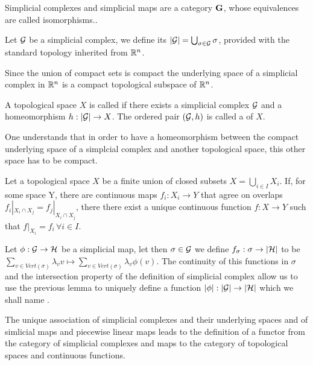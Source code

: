 \documentclass[../1.tex]{subfiles}
\begin{document}
    \begin{thm}
        Simplicial complexes and simplicial maps are a category $\textbf{G}$, whose equivalences are called isomorphisms..
    \end{thm}

    \begin{defn}
        Let $\mathcal{G}$ be a simplicial complex, we define its  $|\mathcal{G}| = \bigcup_{\sigma \in \mathcal{G}} \sigma$, provided with
        the standard topology inherited from $\mathbb{R}^n$.
    \end{defn}

    Since the union of compact sets is compact the underlying space of a simplicial complex in $\mathbb{R}^n$ is a compact topological subspace of $\mathbb{R}^n$.

    \begin{defn}
        A topological space $X$ is called  if there exists a simplicial complex $\mathcal{G}$ and a homeomorphism
        $h : |\mathcal{G}| \to X$. The ordered pair $(\mathcal{G}, h)$ is called a  of $X$.
    \end{defn}

    One understands that in order to have a homeomorphism between the compact underlying space of a simplcial complex and another topological
    space, this other space has to be compact.

    \begin{lem}
        Let a topological space $X$ be a finite union of closed subsets $X = \bigcup_{i \in I} X_i$. If, for some space Y, there are continuous
        maps $f_i : X_i \to Y$ that agree on overlaps $f_i |_{X_i \cap X_j} = f_j |_{X_i \cap X_j}$, there there exist a unique continuous
        function $f : X \to Y$ such that $f |_{X_i} = f_i \, \forall i \in I$.
    \end{lem}

    \begin{defn}
        Let $\phi : \mathcal{G} \to \mathcal{H}$ be a simplicial map, let then $\sigma \in \mathcal{G}$ we define $f_\sigma : \sigma \to |\mathcal{H}|$ to be 
        $\sum_{v \in Vert(\sigma)} \lambda_v v \mapsto \sum_{v \in Vert(\sigma)} \lambda_v \phi(v)$. The continuity of this functions in $\sigma$ and the
        intersection property of the definition of simplicial complex allow us to use the previous lemma to uniquely define a function $|\phi| : |\mathcal{G}| \to |\mathcal{H}|$
        which we shall name .
    \end{defn}

    The unique association of simplicial complexes and their underlying spaces and of simlicial maps and piecewise linear maps leads to the definition
    of a functor from the category of simplicial complexes and maps to the category of topological spaces and continuous functions.
\end{document}

